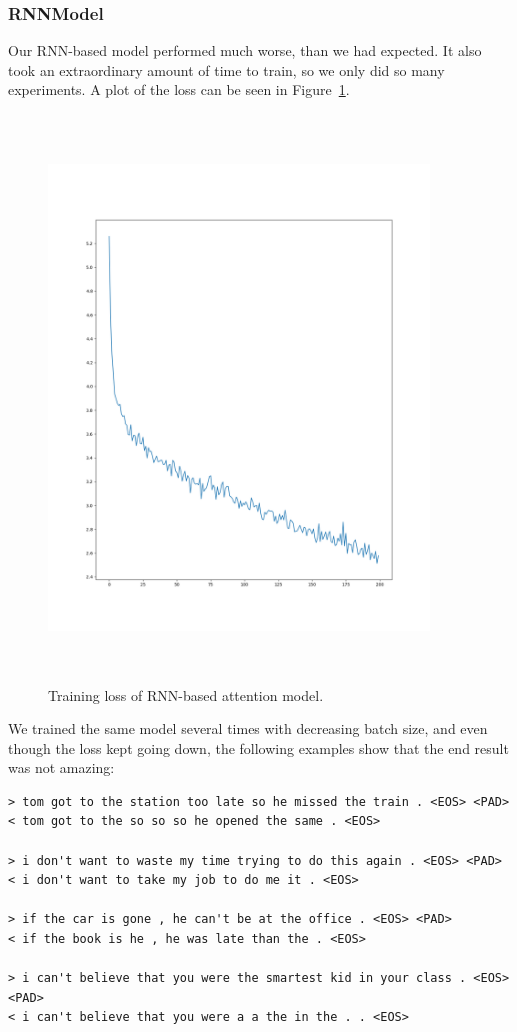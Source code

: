 \documentclass{article}
\begin{document}
\subsubsection{RNNModel}

Our RNN-based model performed much worse, than we had expected. It also took an
extraordinary amount of time to train, so we only did so many experiments. A
plot of the loss can be seen in Figure~\ref{fig:rnnLoss}. 

\begin{figure}[h!]
    \captionsetup{width=0.8\textwidth}
    \includegraphics[width=0.9\textwidth, height=15cm]{RNN-loss-part1.png}
    \caption{%
        Training loss of RNN-based attention model.
    }\label{fig:rnnLoss}
\end{figure}

We trained the same model several times with decreasing batch size, and even
though the loss kept going down, the following examples show that the end result
was not amazing:

\begin{verbatim}
> tom got to the station too late so he missed the train . <EOS> <PAD>
< tom got to the so so so he opened the same . <EOS>

> i don't want to waste my time trying to do this again . <EOS> <PAD>
< i don't want to take my job to do me it . <EOS>

> if the car is gone , he can't be at the office . <EOS> <PAD>
< if the book is he , he was late than the . <EOS>

> i can't believe that you were the smartest kid in your class . <EOS> <PAD>
< i can't believe that you were a a the in the . . <EOS>
\end{verbatim}
\end{document}
